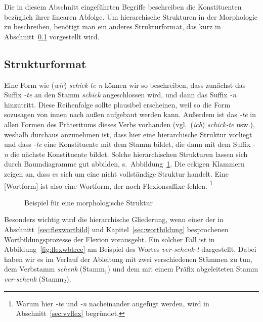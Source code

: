 Die in diesem Abschnitt eingeführten Begriffe beschreiben die Konstituenten bezüglich ihrer linearen Abfolge.
Um hierarchische Strukturen in der Morphologie zu beschreiben, benötigt man ein anderes Strukturformat, das kurz in Abschnitt~\ref{sec:morphstrukform} vorgestellt wird.


\subsection{Strukturformat}

\label{sec:morphstrukform}

Eine Form wie (\textit{wir}) \textit{schick-te-n} können wir so beschreiben, dass zunächst das Suffix \textit{-te} an den Stamm \textit{schick} angeschlossen wird, und dann das Suffix \textit{-n} hinzutritt.
Diese Reihenfolge sollte plausibel erscheinen, weil so die Form sozusagen von innen nach außen aufgebaut werden kann.
Außerdem ist das \textit{-te} in allen Formen des Präteritums dieses Verbs vorhanden (vgl.\ (\textit{ich}) \textit{schick-te} usw.), weshalb durchaus anzunehmen ist, dass hier eine hierarchische Struktur vorliegt und dass \textit{-te} eine Konstituente mit dem Stamm bildet, die dann mit dem Suffix \textit{-n} die nächste Konstituente bildet.
Solche hierarchischen Strukturen lassen sich durch Baumdiagramme gut abbilden, s.\ Abbildung~\ref{fig:flextree}.
Die eckigen Klammern zeigen an, dass es sich um eine nicht vollständige Struktur handelt.
Eine [Wortform] ist also eine Wortform, der noch Flexionsaffixe fehlen.%
\footnote{Warum hier \textit{-te} und \textit{-n} nacheinander angefügt werden, wird in Abschnitt~\ref{sec:vvflex} begründet.}

\begin{figure}[!htbp]
  \centering
  \caption{Beispiel für eine morphologische Struktur}
  \label{fig:flextree}
\end{figure}

Besonders wichtig wird die hierarchische Gliederung, wenn einer der in Abschnitt~\ref{sec:flexwortbild} und Kapitel~\ref{sec:wortbildung} besprochenen Wortbildungsprozesse der Flexion vorausgeht.
Ein solcher Fall ist in Abbildung~\ref{fig:flexwbtree} am Beispiel des Wortes \textit{ver-schenk-t} dargestellt.
Dabei haben wir es im Verlauf der Ableitung mit zwei verschiedenen Stämmen zu tun, dem Verbstamm \textit{schenk} (Stamm$_{\text{1}}$) und dem mit einem Präfix abgeleiteten Stamm \textit{ver-schenk} (Stamm$_{\text{2}}$).

